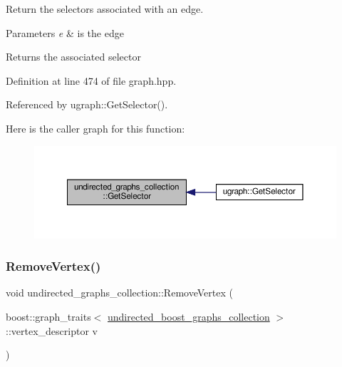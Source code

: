 Return the selectors associated with an edge. 


\begin{DoxyParams}{Parameters}
{\em e} & is the edge \\
\hline
\end{DoxyParams}
\begin{DoxyReturn}{Returns}
the associated selector 
\end{DoxyReturn}


Definition at line 474 of file graph.\+hpp.



Referenced by ugraph\+::\+Get\+Selector().

Here is the caller graph for this function\+:
\nopagebreak
\begin{figure}[H]
\begin{center}
\leavevmode
\includegraphics[width=350pt]{d8/d39/structundirected__graphs__collection_ae158b1b071dac0c598811834596bef0d_icgraph}
\end{center}
\end{figure}
\mbox{\label{structundirected__graphs__collection_a6130fc3591740847e69e04ab702fffc5}} 
\subsubsection{\texorpdfstring{Remove\+Vertex()}{RemoveVertex()}}
{\footnotesize\ttfamily void undirected\+\_\+graphs\+\_\+collection\+::\+Remove\+Vertex (\begin{DoxyParamCaption}\item[{boost\+::graph\+\_\+traits$<$ \hyperlink{graph_8hpp_ab216188797d8e0a41236453b1a520b16}{undirected\+\_\+boost\+\_\+graphs\+\_\+collection} $>$\+::vertex\+\_\+descriptor}]{v }\end{DoxyParamCaption})\hspace{0.3cm}{\ttfamily [inline]}}



